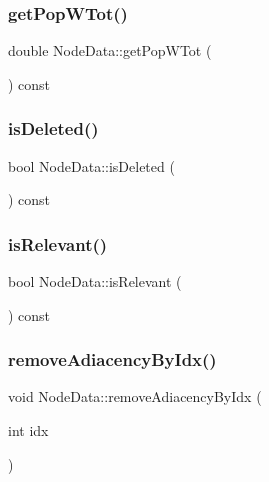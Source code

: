 \mbox{\label{class_node_data_a5903c8c233f8892f1b29baa26f361288}} 
\subsubsection{\texorpdfstring{getPopWTot()}{getPopWTot()}}
{\footnotesize\ttfamily double Node\+Data\+::get\+Pop\+W\+Tot (\begin{DoxyParamCaption}{ }\end{DoxyParamCaption}) const}

\mbox{\label{class_node_data_a1839982b09f3e47302aa9c36ab507cb7}} 
\subsubsection{\texorpdfstring{isDeleted()}{isDeleted()}}
{\footnotesize\ttfamily bool Node\+Data\+::is\+Deleted (\begin{DoxyParamCaption}{ }\end{DoxyParamCaption}) const}

\mbox{\label{class_node_data_a43aa00e322ea393d87cd3887d2b6d018}} 
\subsubsection{\texorpdfstring{isRelevant()}{isRelevant()}}
{\footnotesize\ttfamily bool Node\+Data\+::is\+Relevant (\begin{DoxyParamCaption}{ }\end{DoxyParamCaption}) const\hspace{0.3cm}{\ttfamily [inline]}}

\mbox{\label{class_node_data_a75b19599e6278c1f397cd9389499dc02}} 
\subsubsection{\texorpdfstring{removeAdiacencyByIdx()}{removeAdiacencyByIdx()}}
{\footnotesize\ttfamily void Node\+Data\+::remove\+Adiacency\+By\+Idx (\begin{DoxyParamCaption}\item[{int}]{idx }\end{DoxyParamCaption})}

